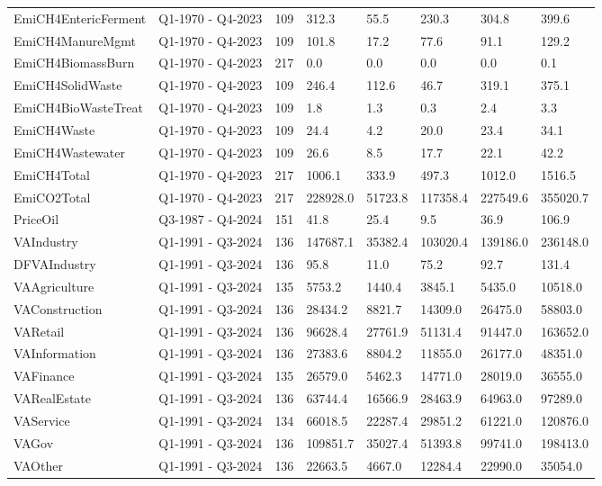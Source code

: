\begin{longtable}[t]{llllllll}
\addlinespace
EmiCH4EntericFerment & Q1-1970 - Q4-2023 & 109 & 312.3 & 55.5 & 230.3 & 304.8 & 399.6\\
EmiCH4ManureMgmt & Q1-1970 - Q4-2023 & 109 & 101.8 & 17.2 & 77.6 & 91.1 & 129.2\\
EmiCH4BiomassBurn & Q1-1970 - Q4-2023 & 217 & 0.0 & 0.0 & 0.0 & 0.0 & 0.1\\
EmiCH4SolidWaste & Q1-1970 - Q4-2023 & 109 & 246.4 & 112.6 & 46.7 & 319.1 & 375.1\\
EmiCH4BioWasteTreat & Q1-1970 - Q4-2023 & 109 & 1.8 & 1.3 & 0.3 & 2.4 & 3.3\\
\addlinespace
EmiCH4Waste & Q1-1970 - Q4-2023 & 109 & 24.4 & 4.2 & 20.0 & 23.4 & 34.1\\
EmiCH4Wastewater & Q1-1970 - Q4-2023 & 109 & 26.6 & 8.5 & 17.7 & 22.1 & 42.2\\
EmiCH4Total & Q1-1970 - Q4-2023 & 217 & 1006.1 & 333.9 & 497.3 & 1012.0 & 1516.5\\
EmiCO2Total & Q1-1970 - Q4-2023 & 217 & 228928.0 & 51723.8 & 117358.4 & 227549.6 & 355020.7\\
PriceOil & Q3-1987 - Q4-2024 & 151 & 41.8 & 25.4 & 9.5 & 36.9 & 106.9\\
\addlinespace
VAIndustry & Q1-1991 - Q3-2024 & 136 & 147687.1 & 35382.4 & 103020.4 & 139186.0 & 236148.0\\
DFVAIndustry & Q1-1991 - Q3-2024 & 136 & 95.8 & 11.0 & 75.2 & 92.7 & 131.4\\
VAAgriculture & Q1-1991 - Q3-2024 & 135 & 5753.2 & 1440.4 & 3845.1 & 5435.0 & 10518.0\\
VAConstruction & Q1-1991 - Q3-2024 & 136 & 28434.2 & 8821.7 & 14309.0 & 26475.0 & 58803.0\\
VARetail & Q1-1991 - Q3-2024 & 136 & 96628.4 & 27761.9 & 51131.4 & 91447.0 & 163652.0\\
\addlinespace
VAInformation & Q1-1991 - Q3-2024 & 136 & 27383.6 & 8804.2 & 11855.0 & 26177.0 & 48351.0\\
VAFinance & Q1-1991 - Q3-2024 & 135 & 26579.0 & 5462.3 & 14771.0 & 28019.0 & 36555.0\\
VARealEstate & Q1-1991 - Q3-2024 & 136 & 63744.4 & 16566.9 & 28463.9 & 64963.0 & 97289.0\\
VAService & Q1-1991 - Q3-2024 & 134 & 66018.5 & 22287.4 & 29851.2 & 61221.0 & 120876.0\\
VAGov & Q1-1991 - Q3-2024 & 136 & 109851.7 & 35027.4 & 51393.8 & 99741.0 & 198413.0\\
\addlinespace
VAOther & Q1-1991 - Q3-2024 & 136 & 22663.5 & 4667.0 & 12284.4 & 22990.0 & 35054.0\\

\end{longtable}
